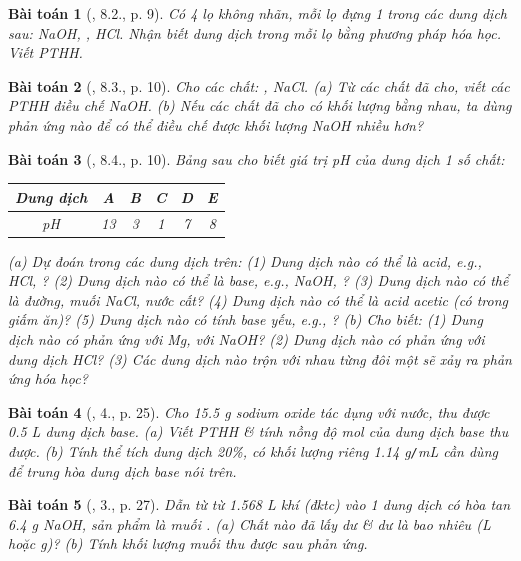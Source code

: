 \documentclass{article}
\newtheorem{baitoan}{Bài toán}
\begin{document}
\begin{baitoan}[\cite{SGK_Hoa_Hoc_9}, 8.2., p. 9]
	Có 4 lọ không nhãn, mỗi lọ đựng 1 trong các dung dịch sau: {\rm NaOH, , HCl}. Nhận biết dung dịch trong mỗi lọ bằng phương pháp hóa học. Viết {\rm PTHH}.
\end{baitoan}

\begin{baitoan}[\cite{SGK_Hoa_Hoc_9}, 8.3., p. 10]
	Cho các chất: {\rm{}, NaCl}. (a) Từ các chất đã cho, viết các {\rm PTHH} điều chế {\rm NaOH}. (b) Nếu các chất đã cho có khối lượng bằng nhau, ta dùng phản ứng nào để có thể điều chế được khối lượng {\rm NaOH} nhiều hơn?
\end{baitoan}

\begin{baitoan}[\cite{SGK_Hoa_Hoc_9}, 8.4., p. 10]
	Bảng sau cho biết giá trị pH của dung dịch 1 số chất:
	\begin{table}[H]
		\centering
		\begin{tabular}{|c|c|c|c|c|c|}
			\hline
			Dung dịch & A & B & C & D & E \\
			\hline
			pH & 13 & 3 & 1 & 7 & 8 \\
			\hline
		\end{tabular}
	\end{table}
	\noindent(a) Dự đoán trong các dung dịch trên: (1) Dung dịch nào có thể là acid, e.g., {\rm HCl, }? (2) Dung dịch nào có thể là base, e.g., {\rm NaOH, }? (3) Dung dịch nào có thể là đường, muối {\rm NaCl}, nước cất? (4) Dung dịch nào có thể là acid acetic (có trong giấm ăn)? (5) Dung dịch nào có tính base yếu, e.g., {\rm{}}? (b) Cho biết: (1) Dung dịch nào có phản ứng với {\rm Mg}, với {\rm NaOH}? (2) Dung dịch nào có phản ứng với dung dịch {\rm HCl}? (3) Các dung dịch nào trộn với nhau từng đôi một sẽ xảy ra phản ứng hóa học?	
\end{baitoan}

\begin{baitoan}[\cite{SGK_Hoa_Hoc_9}, 4., p. 25]
	Cho {\rm15.5 g} sodium oxide {\rm{}} tác dụng với nước, thu được {\rm0.5 L} dung dịch base. (a) Viết {\rm PTHH} \& tính nồng độ mol của dung dịch base thu được. (b) Tính thể tích dung dịch {\rm{} 20\%}, có khối lượng riêng {\rm1.14 g{\tt/}mL} cần dùng để trung hòa dung dịch base nói trên.
\end{baitoan}

\begin{baitoan}[\cite{SGK_Hoa_Hoc_9}, 3., p. 27]
	Dẫn từ từ {\rm1.568 L} khí {\rm{}} (đktc) vào 1 dung dịch có hòa tan {\rm6.4 g NaOH}, sản phẩm là muối {\rm{}}. (a) Chất nào đã lấy dư \& dư là bao nhiêu ({\rm L} hoặc {\rm g})? (b) Tính khối lượng muối thu được sau phản ứng.
\end{baitoan}
\end{document}
